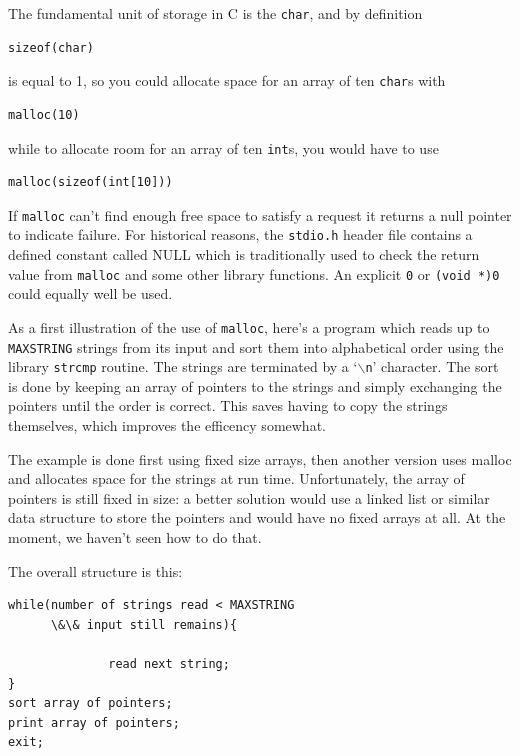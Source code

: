   The fundamental unit of storage in C is the \texttt{char}, and by
   definition


  \begin{Verbatim}
sizeof(char)
\end{Verbatim}

  is equal to 1, so you could allocate space for an array of ten
   \texttt{char}s with


  \begin{Verbatim}
malloc(10)
\end{Verbatim}

  while to allocate room for an array of ten \texttt{int}s, you would
   have to use


  \begin{Verbatim}
malloc(sizeof(int[10]))
\end{Verbatim}

  If \texttt{malloc} can't find enough free space to satisfy
   a request it returns a null pointer to indicate failure. For historical
   reasons, the \texttt{stdio.h} header file contains a defined constant
   called NULL which is traditionally used to check the return value from
   \texttt{malloc} and some other library functions. An explicit
   \texttt{0} or \texttt{(void *)0} could equally well be used.


  As a first illustration of the use of \texttt{malloc}, here's
   a program which reads up to \texttt{MAXSTRING} strings from its input
   and sort them into alphabetical order using the library
   \texttt{strcmp} routine. The strings are terminated by
   a `\texttt{$\backslash$n}' character. The sort is done by keeping an array
   of pointers to the strings and simply exchanging the pointers until the
   order is correct. This saves having to copy the strings themselves, which
   improves the efficency somewhat.


  The example is done first using fixed size arrays, then another version
   uses malloc and allocates space for the strings at run time.
   Unfortunately, the array of pointers is still fixed in size: a better
   solution would use a linked list or similar data structure to store the
   pointers and would have no fixed arrays at all. At the moment, we haven't
   seen how to do that.


  The overall structure is this:


  \begin{Verbatim}
while(number of strings read < MAXSTRING
      \&\& input still remains){

              read next string;
}
sort array of pointers;
print array of pointers;
exit;
\end{Verbatim}

